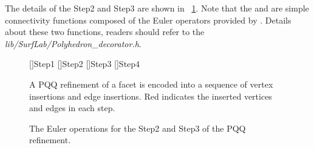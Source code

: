 The details of the Step2 and Step3 are shown in 
\figurename\ \ref{fig:CCRefinementStep23}. Note that the
 and  are simple
connectivity functions composed of the Euler operators provided 
by \cgalpoly . Details about these two functions, readers should refer
to the \emph{lib/SurfLab/Polyhedron\_decorator.h}.
\\

\begin{figure}
  \centering 
  []{Step1}
  []{Step2}
  []{Step3}
  []{Step4}
  \caption{A PQQ refinement of a facet is encoded into a sequence of
  vertex insertions and edge insertions. Red indicates the inserted
  vertices and edges in each step.}
  \label{fig:CCRefinement}
  \vspace{0.6cm}
  \caption{The Euler operations for the Step2 and Step3 of 
  the PQQ refinement.}
  \label{fig:CCRefinementStep23}
\end{figure}

